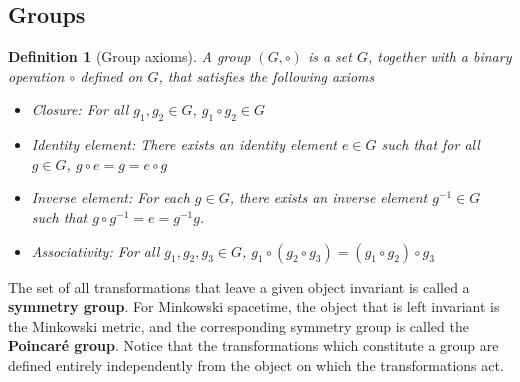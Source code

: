 \documentclass[11pt]{article}
\numberwithin{equation}{section}
\newtheorem{defn}{Definition}[section]
\begin{document}
\subsection{Groups}
\begin{defn}[Group axioms]
A group $(G, \circ)$ is a set $G$, together with a binary operation $\circ$ defined on $G$, that satisfies the following axioms
\begin{itemize}
\item Closure: For all $g_1, g_2 \in G$, $g_1 \circ g_2 \in G$
\item Identity element: There exists an identity element $e \in G$ such that for all $g \in G$, $g \circ e = g = e \circ g$
\item Inverse element: For each $g \in G$, there exists an inverse element $g^{-1} \in G$ such that $g \circ g^{-1} = e = g^{-1}g$.
\item Associativity: For all $g_1, g_2, g_3 \in G$, $g_1 \circ (g_2 \circ g_3) = (g_1 \circ g_2) \circ g_3$
\end{itemize}
\end{defn}

The set of all transformations that leave a given object invariant is called a \textbf{symmetry group}. For Minkowski spacetime, the object that is left invariant is the Minkowski metric, and the corresponding symmetry group is called the \textbf{Poincar\'{e} group}. Notice that the transformations which constitute a group are defined entirely independently from the object on which the transformations act.
\end{document}
